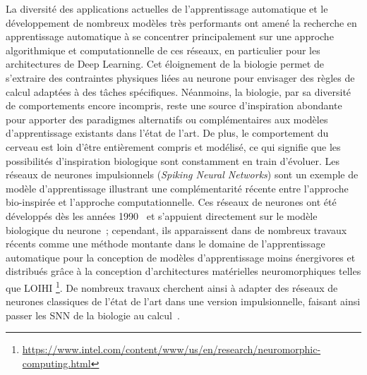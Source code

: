 La diversité des applications actuelles de l'apprentissage automatique et le développement de nombreux modèles très performants ont amené la recherche en apprentissage automatique à se concentrer principalement sur une approche algorithmique et computationnelle de ces réseaux, en particulier pour les architectures de Deep Learning.
Cet éloignement de la biologie permet de s'extraire des contraintes physiques liées au neurone pour envisager des règles de calcul adaptées à des tâches spécifiques.
Néanmoins, la biologie, par sa diversité de comportements encore incompris, reste une source d'inspiration abondante pour apporter des paradigmes alternatifs ou complémentaires aux modèles d'apprentissage existants dans l'état de l'art. De plus, le comportement du cerveau est loin d'être entièrement compris et modélisé, ce qui signifie que les possibilités d'inspiration biologique sont constamment en train d'évoluer. Les réseaux de neurones impulsionnels (\emph{Spiking Neural Networks}) sont un exemple de modèle d'apprentissage illustrant une complémentarité récente entre l'approche bio-inspirée et l'approche computationnelle. Ces réseaux de neurones ont été développés dès les années 1990~\cite{Maass1996NetworksOS} et s'appuient directement sur le modèle biologique du neurone~; cependant, ils apparaissent dans de nombreux travaux récents comme une méthode montante dans le domaine de l'apprentissage automatique pour la conception de modèles d'apprentissage moins énergivores et distribués grâce à la conception d'architectures matérielles neuromorphiques telles que LOIHI \footnote{\url{https://www.intel.com/content/www/us/en/research/neuromorphic-computing.html}}. De nombreux travaux cherchent ainsi à adapter des réseaux de neurones classiques de l'état de l'art dans une version impulsionnelle, faisant ainsi passer les SNN de la biologie au calcul~\cite{Schuman2022OpportunitiesFN}.

